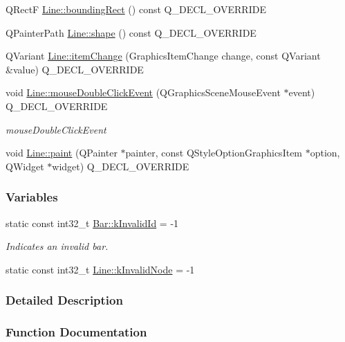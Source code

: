 \begin{DoxyCompactItemize}
\item 
Q\+Rect\+F \hyperlink{group___models_gad15c3af158d3b966c04be7e18cee5aea}{Line\+::bounding\+Rect} () const Q\+\_\+\+D\+E\+C\+L\+\_\+\+O\+V\+E\+R\+R\+I\+D\+E
\item 
Q\+Painter\+Path \hyperlink{group___models_gaf1736b829a643d99052ef6428ddd5b16}{Line\+::shape} () const Q\+\_\+\+D\+E\+C\+L\+\_\+\+O\+V\+E\+R\+R\+I\+D\+E
\item 
Q\+Variant \hyperlink{group___models_ga5fcee3f23eb50e34f730d602a3802b93}{Line\+::item\+Change} (Graphics\+Item\+Change change, const Q\+Variant \&value) Q\+\_\+\+D\+E\+C\+L\+\_\+\+O\+V\+E\+R\+R\+I\+D\+E
\item 
void \hyperlink{group___models_ga9a1fee5b1606ab0deedd04bdab99be70}{Line\+::mouse\+Double\+Click\+Event} (Q\+Graphics\+Scene\+Mouse\+Event $\ast$event) Q\+\_\+\+D\+E\+C\+L\+\_\+\+O\+V\+E\+R\+R\+I\+D\+E
\begin{DoxyCompactList}\small\item\em mouse\+Double\+Click\+Event \end{DoxyCompactList}\item 
void \hyperlink{group___models_ga0aa64aed379d434be5942edf572b444b}{Line\+::paint} (Q\+Painter $\ast$painter, const Q\+Style\+Option\+Graphics\+Item $\ast$option, Q\+Widget $\ast$widget) Q\+\_\+\+D\+E\+C\+L\+\_\+\+O\+V\+E\+R\+R\+I\+D\+E
\end{DoxyCompactItemize}
\subsubsection*{Variables}
\begin{DoxyCompactItemize}
\item 
static const int32\+\_\+t \hyperlink{group___models_ga9919592c0397ed41448dfb20b607d738}{Bar\+::k\+Invalid\+Id} = -\/1
\begin{DoxyCompactList}\small\item\em Indicates an invalid bar. \end{DoxyCompactList}\item 
static const int32\+\_\+t \hyperlink{group___models_gadc334bd07c6126abc56e531d7e3e72b4}{Line\+::k\+Invalid\+Node} = -\/1
\end{DoxyCompactItemize}


\subsubsection{Detailed Description}


\subsubsection{Function Documentation}
\hypertarget{group___models_ga8cbd2f62d92e69ce6c8d561b682464b6}{}
